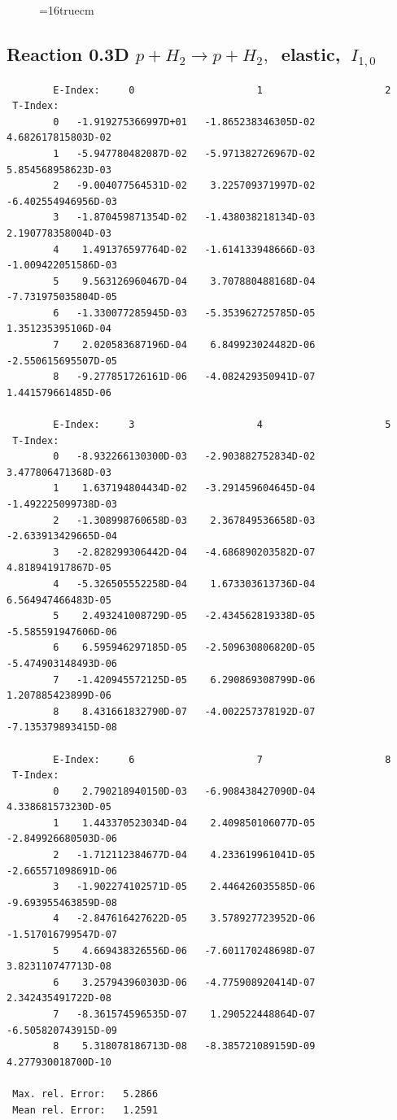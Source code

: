 \documentclass[12pt,dvips]{article}
\begin{document}
\begin{figure} \label{0.3T}
\epsfxsize=16truecm
\end{figure}
\newpage


\subsection{
Reaction 0.3D  $p + H_2 \rightarrow  p + H_2 ,\ $  elastic,
$\  I_{1,0}$
}

\begin{small}\begin{verbatim}
        E-Index:     0                     1                     2
 T-Index:
        0   -1.919275366997D+01   -1.865238346305D-02    4.682617815803D-02
        1   -5.947780482087D-02   -5.971382726967D-02    5.854568958623D-03
        2   -9.004077564531D-02    3.225709371997D-02   -6.402554946956D-03
        3   -1.870459871354D-02   -1.438038218134D-03    2.190778358004D-03
        4    1.491376597764D-02   -1.614133948666D-03   -1.009422051586D-03
        5    9.563126960467D-04    3.707880488168D-04   -7.731975035804D-05
        6   -1.330077285945D-03   -5.353962725785D-05    1.351235395106D-04
        7    2.020583687196D-04    6.849923024482D-06   -2.550615695507D-05
        8   -9.277851726161D-06   -4.082429350941D-07    1.441579661485D-06

        E-Index:     3                     4                     5
 T-Index:
        0   -8.932266130300D-03   -2.903882752834D-02    3.477806471368D-03
        1    1.637194804434D-02   -3.291459604645D-04   -1.492225099738D-03
        2   -1.308998760658D-03    2.367849536658D-03   -2.633913429665D-04
        3   -2.828299306442D-04   -4.686890203582D-07    4.818941917867D-05
        4   -5.326505552258D-04    1.673303613736D-04    6.564947466483D-05
        5    2.493241008729D-05   -2.434562819338D-05   -5.585591947606D-06
        6    6.595946297185D-05   -2.509630806820D-05   -5.474903148493D-06
        7   -1.420945572125D-05    6.290869308799D-06    1.207885423899D-06
        8    8.431661832790D-07   -4.002257378192D-07   -7.135379893415D-08

        E-Index:     6                     7                     8
 T-Index:
        0    2.790218940150D-03   -6.908438427090D-04    4.338681573230D-05
        1    1.443370523034D-04    2.409850106077D-05   -2.849926680503D-06
        2   -1.712112384677D-04    4.233619961041D-05   -2.665571098691D-06
        3   -1.902274102571D-05    2.446426035585D-06   -9.693955463859D-08
        4   -2.847616427622D-05    3.578927723952D-06   -1.517016799547D-07
        5    4.669438326556D-06   -7.601170248698D-07    3.823110747713D-08
        6    3.257943960303D-06   -4.775908920414D-07    2.342435491722D-08
        7   -8.361574596535D-07    1.290522448864D-07   -6.505820743915D-09
        8    5.318078186713D-08   -8.385721089159D-09    4.277930018700D-10

 Max. rel. Error:   5.2866
 Mean rel. Error:   1.2591
\end{verbatim}\end{small}
\end{document}
